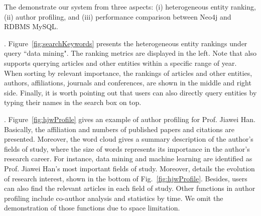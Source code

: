 The demonstrate our system from three aspects: (i) heterogeneous entity ranking, (ii) author profiling, and (iii) performance comparison between Neo4j and RDBMS MySQL.



.
Figure~\ref{fig:searchKeywords} presents the heterogeneous entity rankings under query ``data mining".
%
The ranking metrics are displayed in the left. Note that \oursystem also supports querying articles and other entities within a specific range of year.
When sorting by relevant importance, the rankings of articles and other entities, \ie authors, affiliations, journals and conferences, are shown in the middle and right side.
%
Finally, it is worth pointing out that users can also directly query entities by typing their names in the search box on top. %




.
Figure~\ref{fig:hjwProfile} gives an example of author profiling for Prof. Jiawei Han.
Basically, the affiliation and numbers of published papers and citations are presented.
Moreover, the word cloud gives a summary description of the author's fields of study, where the size of words represents its importance in the author's research career. For instance, data mining and machine learning are identified as Prof. Jiawei Han's most important fields of study.
Moreover, \oursystem details the evolution of research interest, shown in the bottom of Fig.~\ref{fig:hjwProfile}. %
Besides, users can also find the relevant articles in each field of study. Other functions in author profiling include co-author analysis and statistics by time. We omit the demonstration of those functions due to space limitation.


